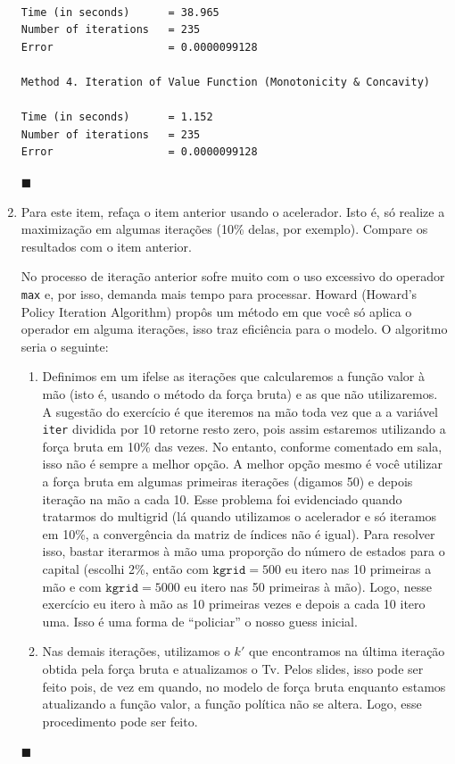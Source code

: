 \documentclass[10pt]{article}
\newcommand*{\QEDA}{\hfill\ensuremath{\blacksquare}}%
\newcommand\0{\mathbf{0}}
\newcounter{exercise}
\newcounter{problem}[exercise]
\newenvironment{sol}
    {\\[1em] {\color{magenta}\text{Resposta.}}
    }
    {{\color{blue!50!black}\QEDA}}
\begin{document}
\begin{enumerate}[wide]
\begin{sol}
\begin{lstlisting}
Time (in seconds)      = 38.965 
Number of iterations   = 235 
Error                  = 0.0000099128 

Method 4. Iteration of Value Function (Monotonicity & Concavity) 

Time (in seconds)      = 1.152 
Number of iterations   = 235 
Error                  = 0.0000099128  
\end{lstlisting}

\end{sol}


\item Para este item, refaça o item anterior usando o acelerador. Isto é, só realize a maximização em algumas iterações (10\% delas, por exemplo).
Compare os resultados com o item anterior.
\begin{sol}
No processo de iteração anterior sofre muito com o uso excessivo do operador \texttt{max} e, por isso, demanda mais tempo para processar. Howard (Howard’s Policy Iteration Algorithm) propôs um método em que você só aplica o operador em alguma iterações, isso traz eficiência para o modelo. O algoritmo seria o seguinte: 

\begin{enumerate}[wide]

\item Definimos em um ifelse as iterações que calcularemos a função valor à mão (isto é, usando o método da força bruta) e as que não utilizaremos. A sugestão do exercício é que iteremos na mão toda vez que a a variável \texttt{iter} dividida por 10 retorne resto zero, pois assim estaremos utilizando a força bruta em 10\% das vezes. No entanto, conforme comentado em sala, isso não é sempre a melhor opção. A melhor opção mesmo é você utilizar a força bruta em algumas primeiras iterações (digamos 50) e depois iteração na mão a cada 10. Esse problema foi evidenciado quando tratarmos do multigrid (lá quando utilizamos o acelerador e só iteramos em 10\%, a convergência da matriz de índices não é igual). Para resolver isso, bastar iterarmos à mão uma proporção do número de estados para o capital (escolhi 2\%, então com $\texttt{kgrid} = 500$ eu itero nas 10 primeiras a mão e com $\texttt{kgrid} = 5000$ eu itero nas 50 primeiras à mão). Logo, nesse exercício eu itero à mão as 10 primeiras vezes e depois a cada 10 itero uma. Isso é uma forma de ``policiar'' o nosso guess inicial.


\item Nas demais iterações, utilizamos o $k'$ que encontramos na última iteração obtida pela força bruta e atualizamos o Tv. Pelos slides, isso pode ser feito pois, de vez em quando, no modelo de força bruta enquanto estamos atualizando a função valor, a função política não se altera. Logo, esse procedimento pode ser feito.


\end{enumerate}
\end{sol}
\end{enumerate}
\end{document}
